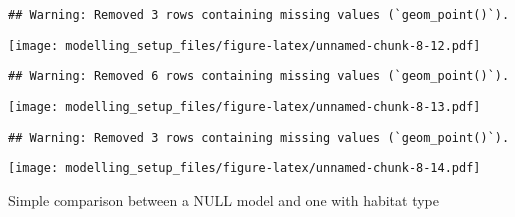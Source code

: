 \documentclass[
]{article}
\begin{document}
\begin{verbatim}
## Warning: Removed 3 rows containing missing values (`geom_point()`).
\end{verbatim}

\texttt{[image: modelling\_setup\_files/figure-latex/unnamed-chunk-8-12.pdf]}

\begin{verbatim}
## Warning: Removed 6 rows containing missing values (`geom_point()`).
\end{verbatim}

\texttt{[image: modelling\_setup\_files/figure-latex/unnamed-chunk-8-13.pdf]}

\begin{verbatim}
## Warning: Removed 3 rows containing missing values (`geom_point()`).
\end{verbatim}

\texttt{[image: modelling\_setup\_files/figure-latex/unnamed-chunk-8-14.pdf]}

Simple comparison between a NULL model and one with habitat type
\end{document}
